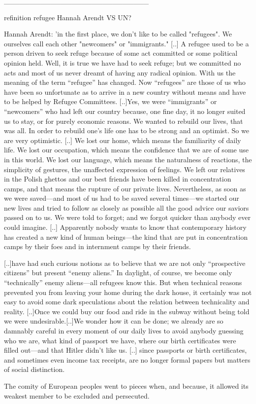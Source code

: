 ____________________________

refinition refugee Hannah Arendt VS UN?

Hannah Arendt: 'in the first place, we don't like to be called "refugees". We ourselves call each other "newcomers" or "immigrants." [..] A refugee used to be a person driven to seek refuge because of some act committed or some political opinion held. Well, it is true we have had to seek refuge; but we committed no acts and most of us never dreamt of having any radical opinion. With us the meaning of the term “refugee” has changed. Now “refugees” are those of us who have been so unfortunate as to arrive in a new country without means and have to be helped by Refugee Committees.
[..]Yes, we were “immigrants” or “newcomers” who had left our country because, one fine day, it no longer suited us to stay, or for purely economic reasons. We wanted to rebuild our lives, that was all. In order to rebuild one’s life one has to be strong and an optimist. So we are very optimistic. [..]
We lost our home, which means the familiarity of daily life. We lost our occupation, which means the confidence that we are of some use in this world. We lost our language, which means the naturalness of reactions, the simplicity of gestures, the unaffected expression of feelings. We left our relatives in the Polish ghettos and our best friends have been killed in concentration camps, and that means the rupture of our private lives.
Nevertheless, as soon as we were saved—and most of us had to be saved several times—we started our new lives and tried to follow as closely as possible all the good advice our saviors passed on to us. We were told to forget; and we forgot quicker than anybody ever could imagine.
[..] Apparently nobody wants to know that contemporary history has created a new kind of human beings—the kind that are put in concentration camps by their foes and in internment camps by their friends.

[..]have had such curious notions as to believe that we are not only “prospective citizens” but present “enemy aliens.” In daylight, of course, we become only “technically” enemy aliens—all refugees know this. But when technical reasons prevented you from leaving your home during the dark house, it certainly was not easy to avoid some dark speculations about the relation between technicality and reality.
[..]Once we could buy our food and ride in the subway without being told we were undesirable.[..]We wonder how it can be done; we already are so damnably careful in every moment of our daily lives to avoid anybody guessing who we are, what kind of passport we have, where our birth certificates were filled out—and that Hitler didn’t like us. 
[..] since passports or birth certificates, and sometimes even income tax receipts, are no longer formal papers but matters of social distinction.

The comity of European peoples went to pieces when, and because, it allowed its weakest member to be excluded and persecuted.